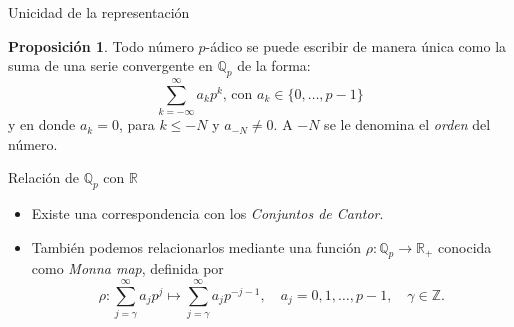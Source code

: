 \documentclass{beamer}
\theoremstyle{definition}
\numberwithin{equation}{section}
\newcommand{\orangee}[1]{\textcolor{thColor}{#1}}
\newtheorem{pr}{\orangee{Proposición}}
\renewcommand{\geq}{\geqslant}
\renewcommand{\leq}{\leqslant}
\newcommand{\R}{\mathbb{R}}
\newcommand{\Qp}{\mathbb{Q}_p}
\DeclareMathOperator{\ord}{Ord}
\begin{document}
\begin{frame}{Unicidad de la representación}
	\begin{pr}
		Todo número $p$-ádico se puede escribir de manera única como la suma de una serie convergente en  $\Qp$ de la forma:
		\begin{equation}
		\sum_{k=-\infty}^{\infty} a_{k} p^{k}\text{, con $a_k\in\{0,\dots,p-1\}$}	\label{eq:1}
		\end{equation}
		y en donde $a_k=0$, para $k\leq - N$ y $a_{-N}\neq 0$\label{ord_def_2}. A $-N$ se le denomina el \textit{orden} del número.
	\end{pr}
\end{frame}

\begin{frame}{Relación de $\Qp$ con $\R$}
	\begin{itemize}
		\item Existe una correspondencia con los \textit{Conjuntos de Cantor}.
		\item También podemos relacionarlos mediante una función $\rho\colon\Qp\to\R_{+}$ conocida como \textit{Monna map}, definida por
		\begin{equation}\label{Monna}
		\rho: \sum_{j=\gamma}^{\infty} a_{j} p^{j} \mapsto \sum_{j=\gamma}^{\infty} a_{j} p^{-j-1}, \quad a_{j}=0,1, \ldots, p-1, \quad \gamma \in \mathbb{Z}.
		\end{equation}
	\end{itemize}
\end{frame}

\end{document}
